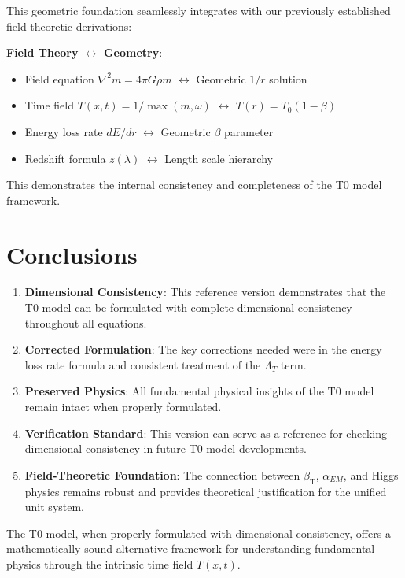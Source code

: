 \documentclass[12pt,a4paper]{article}
\newcommand{\betaT}{\beta_{\text{T}}}
\begin{document}
This geometric foundation seamlessly integrates with our previously established field-theoretic derivations:

\textbf{Field Theory $\leftrightarrow$ Geometry}:
\begin{itemize}
	\item Field equation $\nabla^2 m = 4\pi G \rho m$ $\leftrightarrow$ Geometric $1/r$ solution
	\item Time field $T(x,t) = 1/\max(m,\omega)$ $\leftrightarrow$ $T(r) = T_0(1-\beta)$
	\item Energy loss rate $dE/dr$ $\leftrightarrow$ Geometric $\beta$ parameter
	\item Redshift formula $z(\lambda)$ $\leftrightarrow$ Length scale hierarchy
\end{itemize}

This demonstrates the internal consistency and completeness of the T0 model framework.
	\section{Conclusions}
	\label{sec:conclusions}
	
	\begin{enumerate}
		\item \textbf{Dimensional Consistency}: This reference version demonstrates that the T0 model can be formulated with complete dimensional consistency throughout all equations.
		
		\item \textbf{Corrected Formulation}: The key corrections needed were in the energy loss rate formula and consistent treatment of the $\Lambda_T$ term.
		
		\item \textbf{Preserved Physics}: All fundamental physical insights of the T0 model remain intact when properly formulated.
		
		\item \textbf{Verification Standard}: This version can serve as a reference for checking dimensional consistency in future T0 model developments.
		
		\item \textbf{Field-Theoretic Foundation}: The connection between $\betaT$, $\alpha_{EM}$, and Higgs physics remains robust and provides theoretical justification for the unified unit system.
	\end{enumerate}
	
	The T0 model, when properly formulated with dimensional consistency, offers a mathematically sound alternative framework for understanding fundamental physics through the intrinsic time field $T(x,t)$.
	
\end{document}

